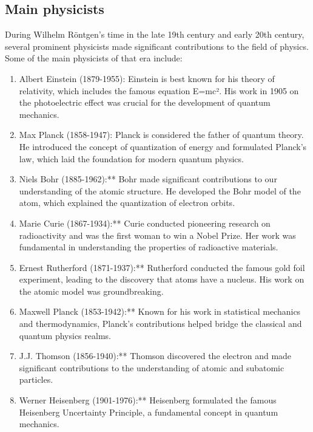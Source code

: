 \documentclass[a4paper,12pt]{report}
\begin{document}
\subsection{Main physicists}
During Wilhelm Röntgen's time in the late 19th century and early 20th century, several prominent physicists made significant contributions to the field of physics. Some of the main physicists of that era include:
\begin{enumerate}


    \item Albert Einstein (1879-1955): Einstein is best known for his theory of relativity, which includes the famous equation E=mc². His work in 1905 on the photoelectric effect was crucial for the development of quantum mechanics.

\item Max Planck (1858-1947): Planck is considered the father of quantum theory. He introduced the concept of quantization of energy and formulated Planck's law, which laid the foundation for modern quantum physics.

\item Niels Bohr (1885-1962):** Bohr made significant contributions to our understanding of the atomic structure. He developed the Bohr model of the atom, which explained the quantization of electron orbits.

\item Marie Curie (1867-1934):** Curie conducted pioneering research on radioactivity and was the first woman to win a Nobel Prize. Her work was fundamental in understanding the properties of radioactive materials.

\item Ernest Rutherford (1871-1937):** Rutherford conducted the famous gold foil experiment, leading to the discovery that atoms have a nucleus. His work on the atomic model was groundbreaking.

\item Maxwell Planck (1853-1942):** Known for his work in statistical mechanics and thermodynamics, Planck's contributions helped bridge the classical and quantum physics realms.

\item J.J. Thomson (1856-1940):** Thomson discovered the electron and made significant contributions to the understanding of atomic and subatomic particles.

\item Werner Heisenberg (1901-1976):** Heisenberg formulated the famous Heisenberg Uncertainty Principle, a fundamental concept in quantum mechanics.
\end{enumerate}
\end{document}
